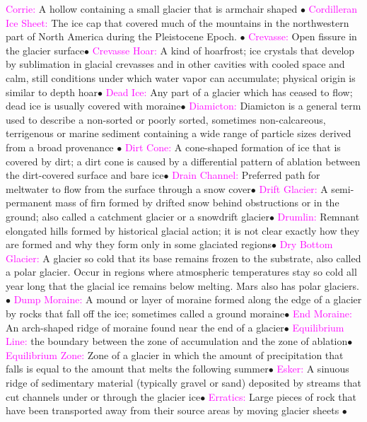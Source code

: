 \documentclass{article}
\newcommand{\ddd}{$\bullet$}
\newcommand{\pink}[1]{\textcolor{magenta}{#1}}
\newcommand{\vocab}[1]{{\pink{#1}}}
\begin{document}
\begin{multicols*}{4}
		\vocab{Corrie: } A hollow containing a small glacier that is armchair shaped \ddd
		\vocab{Cordilleran Ice Sheet: }The ice cap that covered much of the mountains in the northwestern part of North America during the Pleistocene Epoch. \ddd
		\vocab{        Crevasse: } Open fissure in the glacier surface\ddd
		\vocab{        Crevasse Hoar: } A kind of hoarfrost; ice crystals that develop by sublimation in glacial crevasses and in other cavities with cooled space and calm, still conditions under which water vapor can accumulate; physical origin is similar to depth hoar\ddd
		\vocab{        Dead Ice: } Any part of a glacier which has ceased to flow; dead ice is usually covered with moraine\ddd
		\vocab{Diamicton: } Diamicton is a general term used to describe a non-sorted or poorly sorted, sometimes non-calcareous, terrigenous or marine sediment containing a wide range of particle sizes derived from a broad provenance \ddd
		\vocab{        Dirt Cone: } A cone-shaped formation of ice that is covered by dirt; a dirt cone is caused by a differential pattern of ablation between the dirt-covered surface and bare ice\ddd
		\vocab{        Drain Channel: } Preferred path for meltwater to flow from the surface through a snow cover\ddd
		\vocab{        Drift Glacier: } A semi-permanent mass of firn formed by drifted snow behind obstructions or in the ground; also called a catchment glacier or a snowdrift glacier\ddd
		\vocab{        Drumlin: } Remnant elongated hills formed by historical glacial action; it is not clear exactly how they are formed and why they form only in some glaciated regions\ddd
		\vocab{Dry Bottom Glacier: } A glacier so cold that its base remains frozen to the substrate, also called a polar glacier. Occur in regions where atmospheric temperatures stay so cold all year long that the glacial ice remains below melting. Mars also has polar glaciers. \ddd
		\vocab{        Dump Moraine: } A mound or layer of moraine formed along the edge of a glacier by rocks that fall off the ice; sometimes called a ground moraine\ddd
		\vocab{        End Moraine: } An arch-shaped ridge of moraine found near the end of a glacier\ddd
		\vocab{Equilibrium Line: }the boundary between the zone of accumulation and the zone of ablation\ddd
		\vocab{        Equilibrium Zone: } Zone of a glacier in which the amount of precipitation that falls is equal to the amount that melts the following summer\ddd
		\vocab{        Esker: } A sinuous ridge of sedimentary material (typically gravel or sand) deposited by streams that cut channels under or through the glacier ice\ddd
		\vocab{Erratics: } Large pieces of rock that have been transported away from their source areas by moving glacier sheets \ddd

\end{multicols*}
\end{document}

